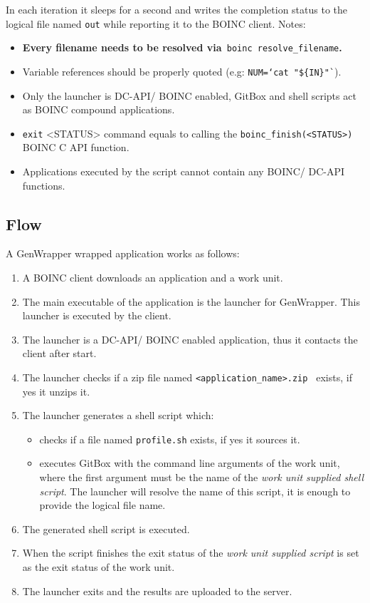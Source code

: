 \documentclass[a4paper,12pt,titlepage,dvipdfm]{article}
\begin{document}
In each iteration it sleeps for a second and writes the completion status to the logical file named \texttt{out} while reporting it to the BOINC client. Notes:
\begin{itemize}
    \item \textbf{Every filename needs to be resolved via}\texttt{ boinc resolve\_filename}\textbf{.}
    \item Variable references should be properly quoted (e.g: \texttt{NUM=`cat "\$\{IN\}"`}).
    \item Only the launcher is DC-API/ BOINC enabled, GitBox and shell scripts act as BOINC compound applications.
    \item \texttt{exit} <STATUS> command equals to calling the \texttt{boinc\_finish(<STATUS>)} BOINC C API function.
    \item Applications executed by the script cannot contain any BOINC/ DC-API functions.
\end{itemize}

\subsection{Flow}

A GenWrapper wrapped application works as follows:
\begin{enumerate}
    \item A BOINC client downloads an application and a work unit.
    \item The main executable of the application is the launcher for GenWrapper. This launcher is executed by the client.
    \item The launcher is a DC-API/ BOINC enabled application, thus it contacts the client after start.
    \item The launcher checks if a zip file named \texttt{<application\_name>.zip } exists, if yes it unzips it.
    \item The launcher generates a shell script which:
        \begin{itemize}
            \item checks if a file named \texttt{profile.sh} exists, if yes it sources it.
            \item executes GitBox with the command line arguments of the work unit, where the first argument must be the name of the \emph{work unit supplied shell script}. The launcher will resolve the name of this script, it is enough to provide the logical file name.
        \end{itemize}
    
    \item The generated shell script is executed.
    \item When the script finishes the exit status of the \emph{work unit supplied script} is set as the exit status of the work unit.
    \item The launcher exits and the results are uploaded to the server.
\end{enumerate}
\end{document}
